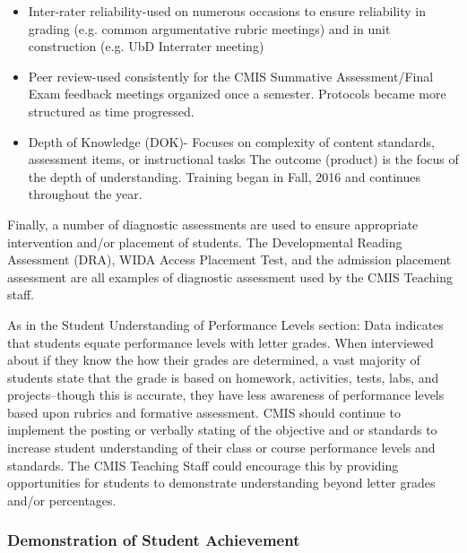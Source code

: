 \begin{findings}
\begin{itemize}
\item Inter-rater reliability-used on numerous occasions to ensure reliability in grading (e.g. common argumentative rubric meetings) and in unit construction (e.g. UbD Interrater meeting) 
\item Peer review-used consistently for the CMIS Summative Assessment/Final Exam feedback meetings organized once a semester. Protocols became more structured as time progressed. 
\item Depth of Knowledge (DOK)- Focuses on complexity of content standards, assessment items, or instructional tasks The outcome (product) is the focus of the depth of understanding. Training began in Fall, 2016 and continues throughout the year.
\end{itemize} 

Finally, a number of diagnostic assessments are used to ensure appropriate intervention and/or placement of students. The Developmental Reading Assessment (DRA), WIDA Access Placement Test, and the admission placement assessment are all examples of diagnostic assessment used by the CMIS Teaching staff. 


As in the Student Understanding of Performance Levels section: Data indicates that students equate performance levels with letter grades. When interviewed about if they know the how their grades are determined, a vast majority of students state that the grade is based on homework, activities, tests, labs, and projects--though this is accurate, they have less awareness of performance levels based upon rubrics and formative assessment. CMIS should continue to implement the posting or verbally stating of the objective and or standards to increase student understanding of their class or course performance levels and standards. The CMIS Teaching Staff could encourage this by providing opportunities for students to demonstrate understanding beyond letter grades and/or percentages.
\end{findings}

\subsubsection{Demonstration of Student Achievement}


